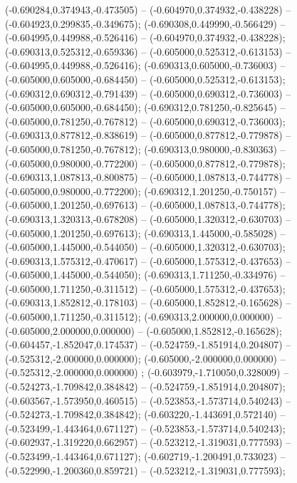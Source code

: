  (-0.690284,0.374943,-0.473505) -- (-0.604970,0.374932,-0.438228) -- (-0.604923,0.299835,-0.349675);
 (-0.690308,0.449990,-0.566429) -- (-0.604995,0.449988,-0.526416) -- (-0.604970,0.374932,-0.438228);
 (-0.690313,0.525312,-0.659336) -- (-0.605000,0.525312,-0.613153) -- (-0.604995,0.449988,-0.526416);
 (-0.690313,0.605000,-0.736003) -- (-0.605000,0.605000,-0.684450) -- (-0.605000,0.525312,-0.613153);
 (-0.690312,0.690312,-0.791439) -- (-0.605000,0.690312,-0.736003) -- (-0.605000,0.605000,-0.684450);
 (-0.690312,0.781250,-0.825645) -- (-0.605000,0.781250,-0.767812) -- (-0.605000,0.690312,-0.736003);
 (-0.690313,0.877812,-0.838619) -- (-0.605000,0.877812,-0.779878) -- (-0.605000,0.781250,-0.767812);
 (-0.690313,0.980000,-0.830363) -- (-0.605000,0.980000,-0.772200) -- (-0.605000,0.877812,-0.779878);
 (-0.690313,1.087813,-0.800875) -- (-0.605000,1.087813,-0.744778) -- (-0.605000,0.980000,-0.772200);
 (-0.690312,1.201250,-0.750157) -- (-0.605000,1.201250,-0.697613) -- (-0.605000,1.087813,-0.744778);
 (-0.690313,1.320313,-0.678208) -- (-0.605000,1.320312,-0.630703) -- (-0.605000,1.201250,-0.697613);
 (-0.690313,1.445000,-0.585028) -- (-0.605000,1.445000,-0.544050) -- (-0.605000,1.320312,-0.630703);
 (-0.690313,1.575312,-0.470617) -- (-0.605000,1.575312,-0.437653) -- (-0.605000,1.445000,-0.544050);
 (-0.690313,1.711250,-0.334976) -- (-0.605000,1.711250,-0.311512) -- (-0.605000,1.575312,-0.437653);
 (-0.690313,1.852812,-0.178103) -- (-0.605000,1.852812,-0.165628) -- (-0.605000,1.711250,-0.311512);
 (-0.690313,2.000000,0.000000) -- (-0.605000,2.000000,0.000000) -- (-0.605000,1.852812,-0.165628);
 (-0.604457,-1.852047,0.174537) -- (-0.524759,-1.851914,0.204807) -- (-0.525312,-2.000000,0.000000);
 (-0.605000,-2.000000,0.000000) -- (-0.525312,-2.000000,0.000000) ;
 (-0.603979,-1.710050,0.328009) -- (-0.524273,-1.709842,0.384842) -- (-0.524759,-1.851914,0.204807);
 (-0.603567,-1.573950,0.460515) -- (-0.523853,-1.573714,0.540243) -- (-0.524273,-1.709842,0.384842);
 (-0.603220,-1.443691,0.572140) -- (-0.523499,-1.443464,0.671127) -- (-0.523853,-1.573714,0.540243);
 (-0.602937,-1.319220,0.662957) -- (-0.523212,-1.319031,0.777593) -- (-0.523499,-1.443464,0.671127);
 (-0.602719,-1.200491,0.733023) -- (-0.522990,-1.200360,0.859721) -- (-0.523212,-1.319031,0.777593);

